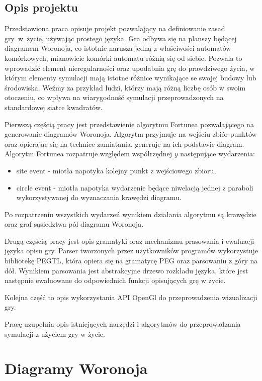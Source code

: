 \documentclass[declaration,shortabstract, inz]{iithesis}
\theoremstyle{definition} \newtheorem{definition}{Definicja}[]
\theoremstyle{plain} \newtheorem{remark}[definition]{Obserwacja}
\theoremstyle{plain} \newtheorem{theorem}[definition]{Twierdzenie}
\theoremstyle{plain} \newtheorem{example}{Przykład}[definition]
\theoremstyle{plain} \newtheorem{lemma}[definition]{Lemat}
\begin{document}
\section{Opis projektu}

Przedstawiona praca opisuje projekt pozwalający na definiowanie zasad gry~w~życie, używając prostego języka. Gra odbywa się na planszy będącej diagramem Woronoja, co istotnie narusza jedną z właściwości automatów komórkowych, mianowicie komórki automatu różnią się od siebie. Pozwala to wprowadzić element nieregularności oraz upodabnia grę do prawdziwego życia, w którym elementy symulacji mają istotne różnice wynikające se swojej budowy lub środowiska.
Weźmy za przykład ludzi, którzy mają różną liczbę osób w swoim otoczeniu, co wpływa na wiarygodność symulacji przeprowadzonych na standardowej siatce kwadratów.

Pierwszą częścią pracy jest przedstawienie algorytmu Fortunea pozwalającego na generowanie diagramów Woronoja. Algorytm przyjmuje na wejściu zbiór punktów oraz opierając się na technice zamiatania, generuje na ich podstawie diagram.
Algorytm Fortunea rozpatruje względem współrzędnej $y$ następujące wydarzenia:
\begin{itemize}
	\item site event - miotła napotyka kolejny punkt z wejściowego zbioru,
	\item circle event - miotła napotyka wydarzenie będące niwelacją jednej z paraboli wykorzystywanej do wyznaczania krawędzi diagramu.
\end{itemize}
Po rozpatrzeniu wszystkich wydarzeń wynikiem działania algorytmu są krawędzie oraz graf sąsiedztwa pól diagramu Woronoja.

Drugą częścią pracy jest opis gramatyki oraz mechanizmu prasowania i ewaluacji języka opisu gry. Parser tworzonych przez użytkowników programów wykorzystuje bibliotekę PEGTL, która opiera się na gramatycę PEG oraz parsowaniu z góry na dół. Wynikiem parsowania jest abstrakcyjne drzewo rozkładu języka, które jest następnie ewaluowane do odpowiednich funkcji opisujących grę w życie.

Kolejna część to opis wykorzystania API OpenGl do przeprowadzenia wizualizacji gry.

Pracę uzupełnia opis istniejących narzędzi i algorytmów do przeprowadzania symulacji z użyciem gry w życie.

\chapter{Diagramy Woronoja}
\end{document}
